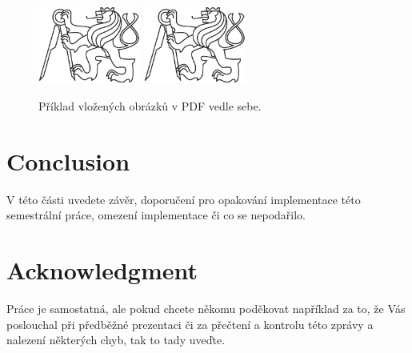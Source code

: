 \documentclass[report,11pt]{elsarticle}
\begin{document}
\begin{figure}[!ht]
\begin{center}
  \includegraphics[width=0.3\textwidth]{cvut-logo-bw}
  \includegraphics[width=0.3\textwidth]{cvut-logo-bw}
\caption{{\label{fig:fig2}}Příklad vložených obrázků v PDF vedle sebe.}
\end{center}
\end{figure}

\section{\label{SEC:Conclusion}Conclusion}

V této části uvedete závěr, doporučení pro opakování implementace této
semestrální práce, omezení implementace či co se nepodařilo.

\section*{\label{SEC:ACK}Acknowledgment}

Práce je samostatná, ale pokud chcete někomu poděkovat například za
to, že Vás poslouchal při předběžné prezentaci či za přečtení a
kontrolu této zprávy a nalezení některých chyb, tak to tady uveďte.

\end{document}
